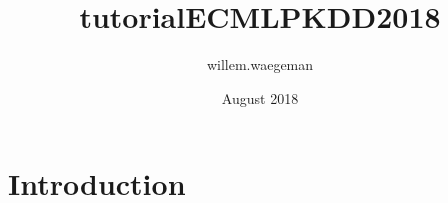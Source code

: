 \documentclass{article}
\title{tutorialECMLPKDD2018}
\author{willem.waegeman }
\date{August 2018}
\begin{document}
\maketitle

\section{Introduction}
\end{document}

